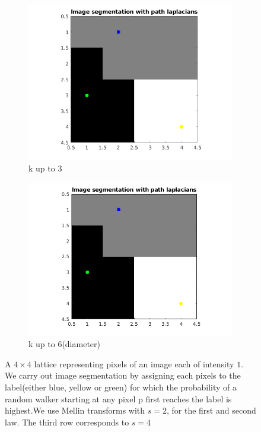 \documentclass[10pt,a4paper]{article}
\begin{document}
\begin{figure}[H]
\begin{subfigure}[b]{0.45\textwidth}
    	\includegraphics[width=\textwidth]{segmentation-images/4by4longrange3-s4.png}
    	\caption{k up to 3}
    \end{subfigure}
    \begin{subfigure}[b]{0.45\textwidth}
    	\includegraphics[width=\textwidth]{segmentation-images/4by4longrange6-s4.png}
    	\caption{k up to 6(diameter)}
    \end{subfigure}  

	\caption{ A $4 \times 4$ lattice representing pixels of an image each of intensity $1$. We carry out image segmentation by assigning each pixels to the label(either blue, yellow or green) for which the probability of a random walker starting at any pixel p first reaches the label is highest.We use Mellin transforms with $s=2$, for the first and second law. The third row corresponds to $s=4$ } 
\end{figure}
\end{document}
